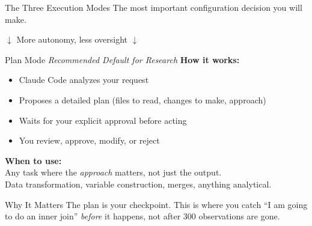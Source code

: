 \documentclass[aspectratio=169, 11pt]{beamer}
\begin{document}

\begin{frame}{The Three Execution Modes}
  \centering
  {\large The most important configuration decision you will make.}

  \vspace{1em}

  \vspace{0.5em}
  \small $\downarrow$ More autonomy, less oversight $\downarrow$
\end{frame}

\begin{frame}{Plan Mode \hfill \normalsize\textit{Recommended Default for Research}}
  \textbf{How it works:}
  \begin{itemize}
    \item Claude Code analyzes your request
    \item Proposes a detailed plan (files to read, changes to make, approach)
    \item Waits for your explicit approval before acting
    \item You review, approve, modify, or reject
  \end{itemize}

  \vspace{0.5em}
  \textbf{When to use:}\\
  Any task where the \textit{approach} matters, not just the output.\\
  Data transformation, variable construction, merges, anything analytical.

  \vspace{0.5em}
  \begin{block}{Why It Matters}
    The plan is your checkpoint. This is where you catch ``I am going to do an inner join'' \textit{before} it happens, not after 300 observations are gone.
  \end{block}
\end{frame}
\end{document}
